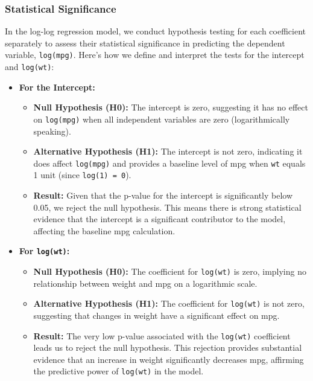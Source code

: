 \documentclass[
  letterpaper,
  DIV=11,
  numbers=noendperiod]{scrreport}
\providecommand{\tightlist}{%
  \setlength{\itemsep}{0pt}\setlength{\parskip}{0pt}}\usepackage{longtable,booktabs,array}
\begin{document}
\subsubsection{Statistical Significance}\label{statistical-significance}

In the log-log regression model, we conduct hypothesis testing for each
coefficient separately to assess their statistical significance in
predicting the dependent variable, \texttt{log(mpg)}. Here's how we
define and interpret the tests for the intercept and \texttt{log(wt)}:

\begin{itemize}
\tightlist
\item
  \textbf{For the Intercept:}

  \begin{itemize}
  \tightlist
  \item
    \textbf{Null Hypothesis (H0):} The intercept is zero, suggesting it
    has no effect on \texttt{log(mpg)} when all independent variables
    are zero (logarithmically speaking).
  \item
    \textbf{Alternative Hypothesis (H1):} The intercept is not zero,
    indicating it does affect \texttt{log(mpg)} and provides a baseline
    level of mpg when \texttt{wt} equals 1 unit (since
    \texttt{log(1)\ =\ 0}).
  \item
    \textbf{Result:} Given that the p-value for the intercept is
    significantly below 0.05, we reject the null hypothesis. This means
    there is strong statistical evidence that the intercept is a
    significant contributor to the model, affecting the baseline mpg
    calculation.
  \end{itemize}
\item
  \textbf{For \texttt{log(wt)}:}

  \begin{itemize}
  \tightlist
  \item
    \textbf{Null Hypothesis (H0):} The coefficient for \texttt{log(wt)}
    is zero, implying no relationship between weight and mpg on a
    logarithmic scale.
  \item
    \textbf{Alternative Hypothesis (H1):} The coefficient for
    \texttt{log(wt)} is not zero, suggesting that changes in weight have
    a significant effect on mpg.
  \item
    \textbf{Result:} The very low p-value associated with the
    \texttt{log(wt)} coefficient leads us to reject the null hypothesis.
    This rejection provides substantial evidence that an increase in
    weight significantly decreases mpg, affirming the predictive power
    of \texttt{log(wt)} in the model.
  \end{itemize}
\end{itemize}
\end{document}
